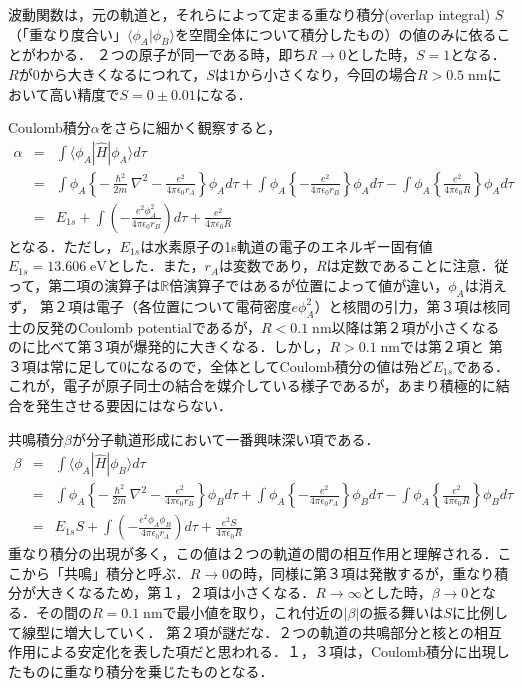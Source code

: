 \documentclass[uplatex, dvipdfmx]{jsreport}
\begin{document}
\begin{example}
    波動関数は，元の軌道と，それらによって定まる重なり積分(overlap integral) $S$（「重なり度合い」$\langle\phi_A|\phi_B\rangle$を空間全体について積分したもの）の値のみに依ることがわかる．
    ２つの原子が同一である時，即ち$R\to 0$とした時，$S=1$となる．$R$が$0$から大きくなるにつれて，$S$は$1$から小さくなり，今回の場合$R>0.5\;\mathrm{nm}$において高い精度で$S=0\pm 0.01$になる．

    Coulomb積分$\alpha$をさらに細かく観察すると，
    \begin{eqnarray*}
        \alpha&=&\int\langle\phi_A|\hat{H}|\phi_A\rangle d\tau \\
        &=& \int\phi_A\left\{ - \frac{\hslash^2}{2m}\nabla^2  - \frac{e^2}{4\pi\epsilon_0r_A}\right\}\phi_Ad\tau +\int\phi_A\left\{ - \frac{e^2}{4\pi\epsilon_0r_B}\right\}\phi_Ad\tau - \int\phi_A\left\{ \frac{e^2}{4\pi\epsilon_0R}\right\}\phi_Ad\tau \\
        &=& E_{1s} + \int\left( - \frac{e^2\phi_A^2}{4\pi\epsilon_0r_B} \right)d\tau + \frac{e^2}{4\pi\epsilon_0R}
    \end{eqnarray*}
    となる．ただし，$E_{1s}$は水素原子の1s軌道の電子のエネルギー固有値$E_{1s}=13.606\;\mathrm{eV}$とした．また，$r_A$は変数であり，$R$は定数であることに注意．従って，第二項の演算子は$\mathbb{R}$倍演算子ではあるが位置によって値が違い，$\phi_A$は消えず，
    第２項は電子（各位置について電荷密度$e\phi_A^2$）と核間の引力，第３項は核同士の反発のCoulomb potentialであるが，$R<0.1\;\mathrm{nm}$以降は第２項が小さくなるのに比べて第３項が爆発的に大きくなる．しかし，$R>0.1\;\mathrm{nm}$では第２項と
    第３項は常に足して$0$になるので，全体としてCoulomb積分の値は殆ど$E_{1s}$である．これが，電子が原子同士の結合を媒介している様子であるが，あまり積極的に結合を発生させる要因にはならない．

    共鳴積分$\beta$が分子軌道形成において一番興味深い項である．
    \begin{eqnarray*}
        \beta &=&\int\langle\phi_A|\hat{H}|\phi_B\rangle d\tau \\
        &=& \int\phi_A\left\{ - \frac{\hslash^2}{2m}\nabla^2  - \frac{e^2}{4\pi\epsilon_0r_B}\right\}\phi_Bd\tau +\int\phi_A\left\{ - \frac{e^2}{4\pi\epsilon_0r_A}\right\}\phi_Bd\tau - \int\phi_A\left\{ \frac{e^2}{4\pi\epsilon_0R}\right\}\phi_Bd\tau \\
        &=& E_{1s}S + \int\left( - \frac{e^2\phi_A\phi_B}{4\pi\epsilon_0r_A} \right)d\tau + \frac{e^2S}{4\pi\epsilon_0R}
    \end{eqnarray*}
    重なり積分の出現が多く，この値は２つの軌道の間の相互作用と理解される．ここから「共鳴」積分と呼ぶ．$R\to 0$の時，同様に第３項は発散するが，重なり積分が大きくなるため，第１，２項は小さくなる．$R\to\infty$とした時，$\beta\to 0$となる．その間の$R=0.1\;\mathrm{nm}$で最小値を取り，これ付近の$|\beta|$の振る舞いは$S$に比例して線型に増大していく．
    第２項が謎だな．２つの軌道の共鳴部分と核との相互作用による安定化を表した項だと思われる．１，３項は，Coulomb積分に出現したものに重なり積分を乗じたものとなる．


\end{example}
\end{document}
